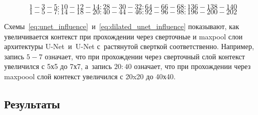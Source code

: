 \begin{equation} 
\label{eq:unet_influence}
1-3-5:10-12-14:28-30-32:64-66-68:136-138-140
\end{equation}
\begin{equation} 
\label{eq:dilated_unet_influence}
1-5-7:14-18-20:40-44-46:92-96-98:196-200-202
\end{equation}

Схемы~\eqref{eq:unet_influence}~и~\eqref{eq:dilated_unet_influence} показывают, как увеличивается контекст при прохождении через сверточные и maxpool слои архитектуры U-Net~и~U-Net с~растянутой сверткой соответственно. Например, запись $5-7$ означает, что при прохождении через сверточный слой контекст увеличился с 5х5 до 7х7, а~запись $20:40$ означает, что при прохождении через maxpoool слой контекст увеличился с 20x20 до 40х40.

\subsection{Результаты} 

